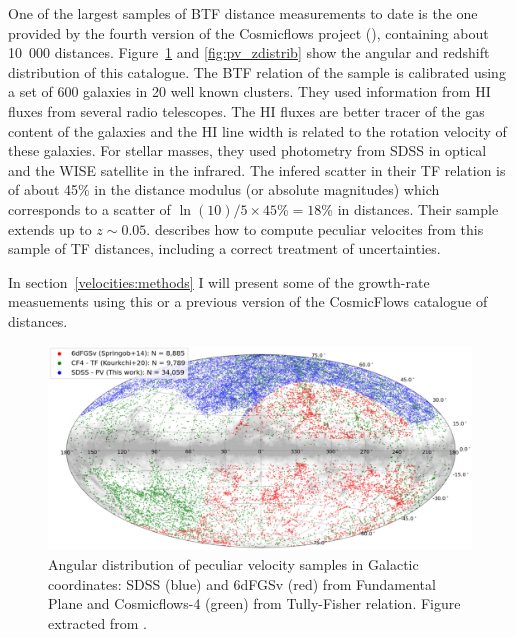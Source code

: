     One of the largest samples of BTF distance measurements to date is the one provided by 
    the fourth version of the Cosmicflows project (\cite{kourkchiCosmicflows4BaryonicTullyFisher2022}), 
    containing about 10~000 distances. 
    Figure~\ref{fig:pv_footprint} and \ref{fig:pv_zdistrib} show the angular and redshift distribution 
    of this catalogue. 
    The BTF relation of the sample is calibrated using a set of 600 galaxies in 20 well known clusters.
    They used information from HI fluxes from several radio telescopes. The HI fluxes are better 
    tracer of the gas content of the galaxies and the HI line width is related to the rotation 
    velocity of these galaxies. For stellar masses, they used photometry from SDSS in optical 
    and the WISE satellite in the infrared. 
    The infered scatter in their TF relation is of about 45\% in the distance modulus (or absolute magnitudes) 
    which corresponds to a scatter of $\ln(10)/5 \times 45$\%$ = 18$\% in distances.  
    Their sample extends up to $z \sim 0.05$. 
    \cite{hoffmanCosmicflowsDistanceModuli2021} describes how to compute peculiar velocites 
    from this sample of TF distances, including a correct treatment of uncertainties. 

    In section~\ref{velocities:methods} I will present some of the growth-rate measuements 
    using this or a previous version of the CosmicFlows catalogue of distances. 


    \begin{figure}
        \centering 
        \includegraphics[width=\textwidth]{fig/velocities/pv_footprints.png}
        \caption{Angular distribution of peculiar velocity samples in Galactic coordinates:
        SDSS (blue) and 6dFGSv (red) from Fundamental Plane and 
        Cosmicflows-4 (green) from Tully-Fisher relation.  
        Figure extracted from \cite{howlettSloanDigitalSky2022a}. }
        \label{fig:pv_footprint}
    \end{figure}

